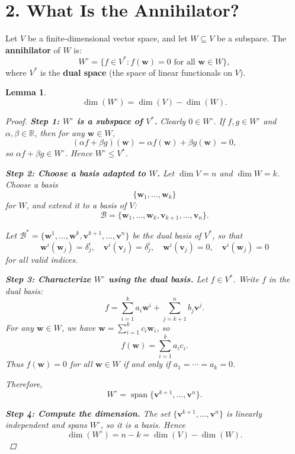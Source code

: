 \documentclass[11pt]{article}
\newtheorem{lemma}{Lemma}
\begin{document}
\section*{2. What Is the Annihilator?}

Let $ V $ be a finite-dimensional vector space, and let $ W \subseteq V $ be a subspace.  
The \textbf{annihilator} of $ W $ is:
\[
W^\circ = \{ f \in V^* : f(\mathbf{w}) = 0 \text{ for all } \mathbf{w} \in W \},
\]
where $ V^* $ is the \textbf{dual space} (the space of linear functionals on $ V $).


\begin{lemma}
\[
\dim(W^\circ) = \dim(V) - \dim(W).
\]
\begin{proof}

\medskip

\noindent\textbf{Step 1: $W^\circ$ is a subspace of $V^*$.}  
Clearly $0 \in W^\circ$. If $f,g \in W^\circ$ and $\alpha,\beta \in \mathbb{R}$, then for any $\mathbf{w} \in W$,
\[
(\alpha f + \beta g)(\mathbf{w}) = \alpha f(\mathbf{w}) + \beta g(\mathbf{w}) = 0,
\]
so $\alpha f + \beta g \in W^\circ$. Hence $W^\circ \leq V^*$.

\medskip

\noindent\textbf{Step 2: Choose a basis adapted to $W$.}  
Let $\dim V = n$ and $\dim W = k$. Choose a basis
\[
\{ \mathbf{w}_1, \dots, \mathbf{w}_k \}
\]
for $W$, and extend it to a basis of $V$:
\[
\mathcal{B} = \{ \mathbf{w}_1, \dots, \mathbf{w}_k, \mathbf{v}_{k+1}, \dots, \mathbf{v}_n \}.
\]

Let $\mathcal{B}^* = \{ \mathbf{w}^1, \dots, \mathbf{w}^k, \mathbf{v}^{k+1}, \dots, \mathbf{v}^n \}$ be the dual basis of $V^*$, so that
\[
\mathbf{w}^i(\mathbf{w}_j) = \delta^i_j, \quad
\mathbf{v}^i(\mathbf{v}_j) = \delta^i_j, \quad
\mathbf{w}^i(\mathbf{v}_j) = 0, \quad
\mathbf{v}^i(\mathbf{w}_j) = 0
\]
for all valid indices.

\medskip

\noindent\textbf{Step 3: Characterize $W^\circ$ using the dual basis.}  
Let $f \in V^*$. Write $f$ in the dual basis:
\[
f = \sum_{i=1}^k a_i \mathbf{w}^i + \sum_{j=k+1}^n b_j \mathbf{v}^j.
\]
For any $\mathbf{w} \in W$, we have $\mathbf{w} = \sum_{i=1}^k c_i \mathbf{w}_i$, so
\[
f(\mathbf{w}) = \sum_{i=1}^k a_i c_i.
\]
Thus $f(\mathbf{w}) = 0$ for all $\mathbf{w} \in W$ if and only if $a_1 = \cdots = a_k = 0$.

Therefore,
\[
W^\circ = \operatorname{span}\{ \mathbf{v}^{k+1}, \dots, \mathbf{v}^n \}.
\]

\medskip

\noindent\textbf{Step 4: Compute the dimension.}  
The set $\{ \mathbf{v}^{k+1}, \dots, \mathbf{v}^n \}$ is linearly independent and spans $W^\circ$, so it is a basis. Hence
\[
\dim(W^\circ) = n - k = \dim(V) - \dim(W).
\]

\end{proof}
\end{lemma}
\end{document}
